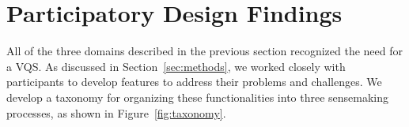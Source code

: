 \section{Participatory Design Findings\label{sec:pd_findings}}
All of the three domains described in the previous section recognized the need for a VQS. As discussed in Section~\ref{sec:methods}, we worked closely with participants to develop features to address their problems and challenges. We develop a taxonomy for organizing these functionalities into three sensemaking processes, as shown in Figure~\ref{fig:taxonomy}. %

